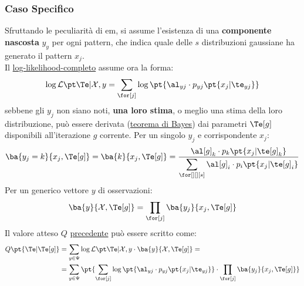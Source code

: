 \subsubsection{Caso Specifico}\label{sec:caso_specifico} %
Sfruttando le peculiarità di \ac{em}, si assume l'esistenza di una \textbf{componente nascosta} $y_y$ per ogni pattern, che indica quale delle $s$ distribuzioni gaussiane ha generato il pattern $x_j$.
\\
Il \hyperref[def:likelihood]{log-likelihood-completo} assume ora la forma:
\[
    \log{\lkho{\Te}{\mathcal X,y}} = \sum_{\for[j]}\log{\pt{\al_{yj} \cdot p_{yj}\pt{x_j|\te_{yj}}}}
\]
sebbene gli $y_j$ non siano noti, \textbf{una loro stima}, o meglio una stima della loro distribuzione, può essere derivata (\hyperref[eq:theor-bayes]{teorema di Bayes}) dai parametri $\Te[g]$ disponibili all'iterazione $g$ corrente.
Per un singolo $y_j$ e corrispondente $x_j$:
\[
    \ba{y_j = k}{x_j,\Te[g]} = \ba{k}{x_j,\Te[g]} = \dfrac{\al[g]_k \cdot p_k\pt{x_j|\te[g]_k}}{\displaystyle\sum_{\for[][][s]}\al[g]_i \cdot p_i\pt{x_j|\te[g]_i}}
\]
Per un generico vettore $y$ di osservazioni:
\[
    \ba{y}{\mathcal X,\Te[g]} = \prod_{\for[j]}\ba{y_j}{x_j,\Te[g]}
\]
Il valore atteso $Q$ \hyperref[sec:caso_generale]{precedente} può essere scritto come:
\[
    \begin{aligned}
        Q\pt{\Te|\Te[g]} &= \sum_{y \in \Psi}{\log{\lkho{\Te}{\mathcal X, y}} \cdot \ba{y}{\mathcal X, \Te[g]}} = \\
                         &= \sum_{y \in \Psi}\pt{\sum_{\for[j]}\log{\pt{\al_{yj}\cdot p_{yj}\pt{x_j|\te_{yj}}} \cdot \prod_{\for[j]}{\ba{y_j}{x_j, \Te[g]}}}}
    \end{aligned}
\]
%

